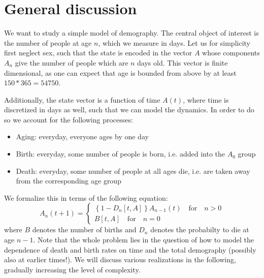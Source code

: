 \documentclass{article}
\begin{document}
\section{General discussion}
We want to study a simple model of demography. The central object of interest is the number of people at age $n$, which we measure in days. Let us for simplicity first neglect sex, such that the state is encoded in the vector $A$ whose components $A_n$ give the number of people which are $n$ days old. This vector is finite dimensional, as one can expect that age is bounded from above by at least $150*365 = 54750$. 

Additionally, the state vector is a function of time $A(t)$, where time is discretized in days as well, such that we can model the dynamics. In order to do so we account for the following processes:
\begin{itemize}
\item Aging: everyday, everyone ages by one day
\item Birth: everyday, some number of people is born, i.e. added into the $A_0$ group
\item Death: everyday, some number of people at all ages die, i.e. are taken away from the corresponding age group
\end{itemize}
We formalize this in terms of the following equation:
\begin{equation}
	A_n\left(t+1\right) = 
	\begin{cases}
		\left\{1 - D_n\left[t,A\right]\right\}A_{n-1}\left(t\right) \quad \text{for} \quad n>0 \\
		B\left[t,A\right] \quad \text{for} \quad n=0
	\end{cases}
\end{equation}
where $B$ denotes the number of births and $D_n$ denotes the probabilty to die at age $n-1$. Note that the whole problem lies in the question of how to model the dependence of death and birth rates on time and the total demography (possibly also at earlier times!). We will discuss various realizations in the following, gradually increasing the level of complexity.
\end{document}
